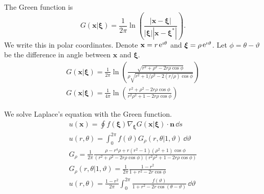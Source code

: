 {\begin{Solution}
  The Green function is
  \[ 
  G(\mathbf{x}|\boldsymbol{\xi})   
  = \frac{1}{2 \pi} \ln \left( \frac{|\mathbf{x} - \boldsymbol{\xi}|}
    {|\boldsymbol{\xi}| |\mathbf{x} - \boldsymbol{\xi}^*|} \right).
  \]
  We write this in polar coordinates.  
  Denote $\mathbf{x} = r \mathop{\mathrm{e}}\nolimits^{\imath \theta}$ and $\boldsymbol{\xi} = \rho \mathop{\mathrm{e}}\nolimits^{\imath \vartheta}$.
  Let $\phi = \theta - \vartheta$ be the difference in 
  angle between $\mathbf{x}$ and $\boldsymbol{\xi}$.
  \begin{gather*}
    G(\mathbf{x}|\boldsymbol{\xi})   
    = \frac{1}{2 \pi} \ln \left( \frac{ \sqrt{ r^2 + \rho^2 - 2 r \rho \cos \phi } }
      {\rho \sqrt{ r^2 + 1/\rho^2 - 2 (r / \rho) \cos \phi } } \right)
    \\
    G(\mathbf{x}|\boldsymbol{\xi})   
    = \frac{1}{4 \pi} \ln \left( \frac{ r^2 + \rho^2 - 2 r \rho \cos \phi }
      { r^2 \rho^2 + 1 - 2 r \rho \cos \phi } \right)
  \end{gather*}

  We solve Laplace's equation with the Green function.
  \begin{gather*}
    u(\mathbf{x}) = \oint f(\boldsymbol{\xi}) \nabla_{\boldsymbol{\xi}} 
    G(\mathbf{x}|\boldsymbol{\xi}) \cdot \mathbf{n} \,\dd s
    \\
    u(r, \theta) = \int_0^{2 \pi} f(\vartheta) G_\rho(r,\theta | 1,\vartheta) \,\dd \vartheta 
    \\
    G_\rho = \frac{1}{2 \pi} \frac{ \rho - r^4 \rho + r (r^2 - 1)(\rho^2 + 1) \cos \phi }
    { (r^2 + \rho^2 - 2 r \rho \cos \phi) (r^2 \rho^2 + 1 - 2 r \rho \cos \phi) }
    \\
    G_\rho(r,\theta | 1,\vartheta) = \frac{1}{2 \pi} \frac{ 1 - r^2 }{ 1 + r^2 - 2 r \cos \phi }
    \\
    u(r, \theta) = \frac{1 - r^2}{2 \pi} \int_0^{2 \pi} 
    \frac{ f(\vartheta) }{ 1 + r^2 - 2 r \cos(\theta - \vartheta) } \,\dd \vartheta 
  \end{gather*}
\end{Solution}






}

